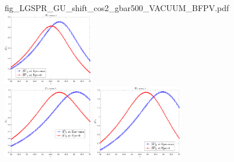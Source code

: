 \documentclass[11pt]{article}
\begin{document}
\begin{figure}[H]
{		{fig_LGSPR_GU_shift_cos2_gbar500_VACUUM_BFPV.pdf}}
	\quad
	\subfigure 
	{\includegraphics[width=0.35\textwidth]
		{fig_LGSPR_GW_shift_cos2_gbar500_VACUUM_BFPV.pdf}}
	\\
	\subfigure 
	{\includegraphics[width=0.35\textwidth]
		{fig_LGSPR_GU_shift_cos2_gbar1000_VACUUM_BFPV.pdf}}
	\quad
	\subfigure 
	{\includegraphics[width=0.35\textwidth]
		{fig_LGSPR_GW_shift_cos2_gbar1000_VACUUM_BFPV.pdf}}
\end{figure}
\end{document}
